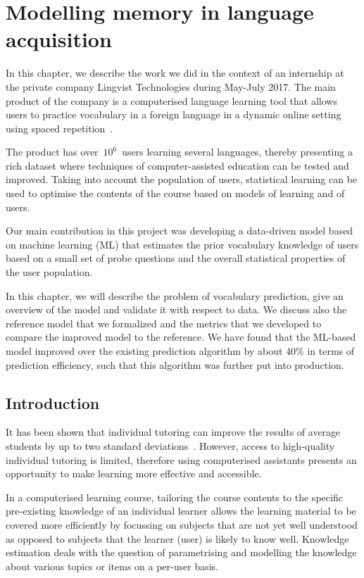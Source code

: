 \chapter{Modelling memory in language acquisition}

In this chapter, we describe the work we did in the context of an internship at the private company Lingvist Technologies during May-July 2017. The main product of the company is a computerised language learning tool that allows users to practice vocabulary in a foreign language in a dynamic online setting using spaced repetition~\cite{lingvist}.

The product has over~$10^6$~users learning several languages, thereby presenting a rich dataset where techniques of computer-assisted education can be tested and improved. Taking into account the population of users, statistical learning can be used to optimise the contents of the course based on models of learning and of users.

Our main contribution in this project was developing a data-driven model based on machine learning (ML) that estimates the prior vocabulary knowledge of users based on a small set of probe questions and the overall statistical properties of the user population. 

In this chapter, we will describe the problem of vocabulary prediction, give an overview of the model and validate it with respect to data. We discuss also the reference model that we formalized and the metrics that we developed to compare the improved model to the reference. We have found that the ML-based model improved over the existing prediction algorithm by about 40\% in terms of prediction efficiency, such that this algorithm was further put into production.

\section{Introduction}
It has been shown that individual tutoring can improve the results of average students by up to two standard deviations~\cite{corbett2001cognitive}. However, access to high-quality individual tutoring is limited, therefore using computerised assistants presents an opportunity to make learning more effective and accessible.

In a computerised learning course, tailoring the course contents to the specific pre-existing knowledge of an individual learner allows the learning material to be covered more efficiently by focussing on subjects that are not yet well understood as opposed to subjects that the learner (user) is likely to know well. Knowledge estimation deals with the question of parametrising and modelling the knowledge about various topics or items on a per-user basis. 

